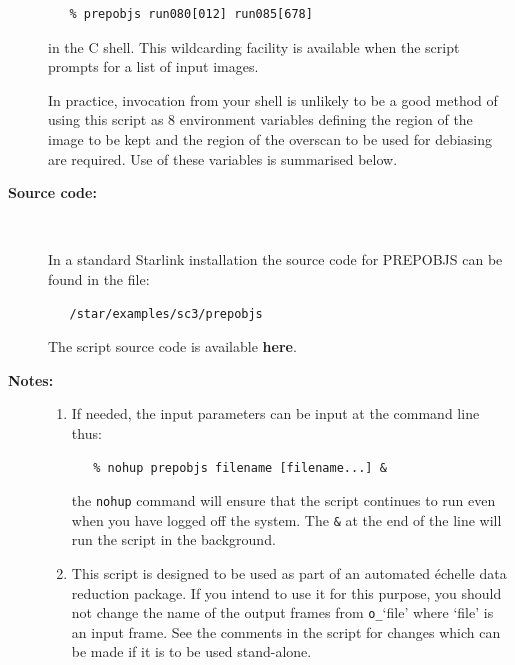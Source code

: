 \documentclass[twoside,11pt]{article}
\newcommand{\htmlref}[2]{#1}
\begin{document}
\begin{description}
\begin{verbatim}
   % prepobjs run080[012] run085[678]
\end{verbatim}

     in the C shell.  This wildcarding facility is available when the
     script prompts for a list of input images.

     In practice, invocation from your shell is unlikely to be a good
     method of using this script as 8 environment variables defining
     the region of the image to be kept and the region of the overscan
     to be used for debiasing are required.  Use of these variables is
     summarised below.

\item [{\bf Source code:}] \mbox{} \\
\begin{latex}
In a standard Starlink installation the source code for PREPOBJS can be found
in the file:
\begin{verbatim}
   /star/examples/sc3/prepobjs
\end{verbatim}
\end{latex}
\begin{htmlonly}
      The script source code is available
      \htmlref{{\bf here}}{se_prepobjs_source}.
\end{htmlonly}

\item [{\bf Notes:}] \mbox{}
\begin{enumerate}

\item If needed, the input parameters can be input at the command
      line thus:

\begin{verbatim}
   % nohup prepobjs filename [filename...] &
\end{verbatim}

      the \verb+nohup+ command will ensure that the script continues
      to run even when you have logged off the system.  The \verb+&+ at
      the end of the line will run the script in the background.

\item This script is designed to be used as part of an automated
      \'{e}chelle data reduction package.  If you intend to use it
      for this purpose, you should not change the name of the output
      frames from \verb+o_+`file' where `file' is an input frame.  See the
      comments in the script for changes which can be made if it is
      to be used stand-alone.


\end{enumerate}
\end{description}
\end{document}

